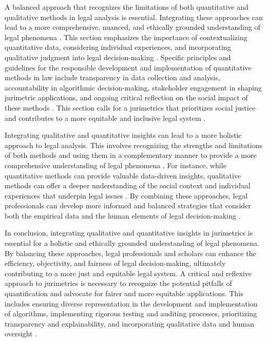 A balanced approach that recognizes the limitations of both quantitative and qualitative methods in legal analysis is essential. Integrating these approaches can lead to a more comprehensive, nuanced, and ethically grounded understanding of legal phenomena \cite{10.1057/s41599-020-00557-0,10.5040/9781350220645}. This section emphasizes the importance of contextualizing quantitative data, considering individual experiences, and incorporating qualitative judgment into legal decision-making \cite{10.1057/s41599-020-00557-0,10.5040/9781350220645}. Specific principles and guidelines for the responsible development and implementation of quantitative methods in law include transparency in data collection and analysis, accountability in algorithmic decision-making, stakeholder engagement in shaping jurimetric applications, and ongoing critical reflection on the social impact of these methods \cite{10.1057/s41599-020-00557-0,10.5040/9781350220645}. This section calls for a jurimetrics that prioritizes social justice and contributes to a more equitable and inclusive legal system \cite{10.1057/s41599-020-00557-0,10.5040/9781350220645}.

Integrating qualitative and quantitative insights can lead to a more holistic approach to legal analysis. This involves recognizing the strengths and limitations of both methods and using them in a complementary manner to provide a more comprehensive understanding of legal phenomena \cite{10.1057/s41599-020-00557-0}. For instance, while quantitative methods can provide valuable data-driven insights, qualitative methods can offer a deeper understanding of the social context and individual experiences that underpin legal issues \cite{10.1057/s41599-020-00557-0}. By combining these approaches, legal professionals can develop more informed and balanced strategies that consider both the empirical data and the human elements of legal decision-making \cite{10.1057/s41599-020-00557-0}.

In conclusion, integrating qualitative and quantitative insights in jurimetrics is essential for a holistic and ethically grounded understanding of legal phenomena. By balancing these approaches, legal professionals and scholars can enhance the efficiency, objectivity, and fairness of legal decision-making, ultimately contributing to a more just and equitable legal system. A critical and reflexive approach to jurimetrics is necessary to recognize the potential pitfalls of quantification and advocate for fairer and more equitable applications. This includes ensuring diverse representation in the development and implementation of algorithms, implementing rigorous testing and auditing processes, prioritizing transparency and explainability, and incorporating qualitative data and human oversight \cite{10.1057/s41599-020-00557-0,10.1590/dados.2022.65.3.267}.


